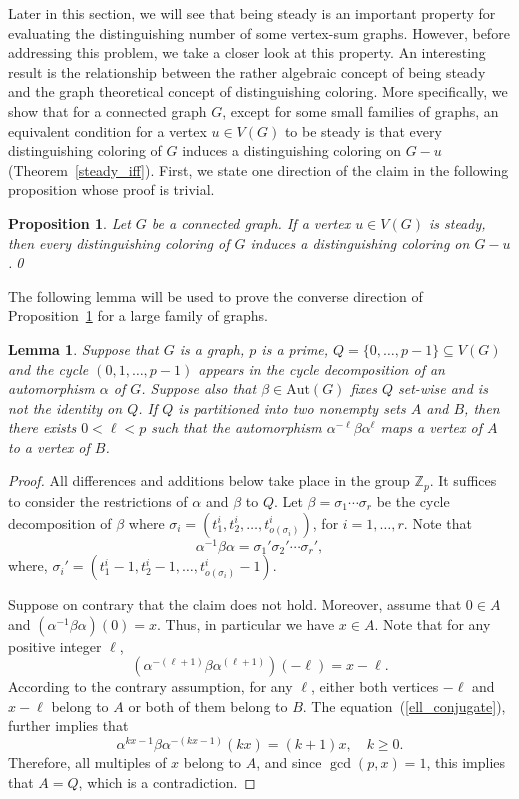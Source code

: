 \documentclass[12pt,a4paper, longbibliography]{article}
\newcommand{\aut}{\mathrm{Aut}}
\newtheorem{lemma}[theorem]{{\color{THM}Lemma}}
\newtheorem{proposition}[theorem]{{\color{THM}Proposition}}
\theoremstyle{definition}
\numberwithin{equation}{section}
\begin{document}
	Later in this section, we will see that being steady is an important property for evaluating the distinguishing number of some vertex-sum graphs. However, before addressing this problem, we   take a closer look at this property. An interesting result is the relationship between the rather algebraic concept of being steady and the graph theoretical concept of distinguishing coloring. More specifically,  we show that for a connected graph $G$, except for some small families of graphs, an equivalent condition for a vertex $u\in V(G)$ to be steady is that every distinguishing coloring of $G$ induces a distinguishing coloring on $G-u$ (Theorem~\ref{steady_iff}). First, we state one direction of the claim in the following proposition whose proof is trivial.
	
	\begin{proposition}\label{steady_then_disting}
		Let $G$ be a connected graph. If a vertex $u\in V(G)$ is steady, then every distinguishing coloring of $G$ induces a distinguishing coloring on $G-u$.\qed
	\end{proposition}

The following lemma  will be used to prove the converse  direction of Proposition~\ref{steady_then_disting} for a large family of graphs.
	
	
	\begin{lemma}\label{partition_A_B}
		Suppose that $G$ is a graph, $p$ is a prime, $Q=\{0,\ldots,p-1\}\subseteq V(G)$ and the cycle $(0,1,\ldots,p-1)$ appears in the cycle decomposition of an automorphism $\alpha$ of $G$. Suppose also that $\beta\in \aut(G)$ fixes $Q$ set-wise and is not the identity on $Q$. If $Q$ is partitioned into two nonempty sets $A$ and $B$, then there exists $0<\ell<p$ such that the automorphism $\alpha^{-\ell} \beta \alpha^{\ell}$ maps a vertex of $A$ to a vertex of $B$.
	\end{lemma}
	\begin{proof}
		All differences and additions below take place in the group $\mathbb{Z}_p$. It suffices to consider the restrictions of $\alpha$ and $\beta$ to $Q$. 
		Let $\beta=\sigma_1\cdots\sigma_r$ be the cycle decomposition of $\beta$ where $\sigma_i=(t_1^i, t_2^i,\ldots, t_{o(\sigma_i)}^i)$, for $i=1,\ldots, r$.  Note that 
		\[\alpha^{-1}\beta \alpha=\sigma_1'\sigma_2'\cdots \sigma_r',\]
		where, $\sigma_i'=(t_1^i-1, t_2^i-1, \ldots, t_{o(\sigma_i)}^i-1)$.
	
Suppose on contrary that the claim does not hold. Moreover, assume that $0\in A$ and $(\alpha^{-1} \beta \alpha)(0)=x$. Thus, in particular we have  $x\in A$.   Note that for any positive integer $\ell$,
\begin{equation}\label{ell_conjugate}
(\alpha^{-(\ell+1)} \beta  \alpha^{(\ell+1)})(-\ell)=x-\ell.
\end{equation}
According to the contrary assumption, for any $\ell$,  either both vertices $-\ell$  and $x-\ell$ belong to $A$ or both of them belong to $B$.
The equation~(\ref{ell_conjugate}), further  implies that
\[ 
\alpha^{kx-1}\beta \alpha^{-(kx-1)} (kx) = (k+1)x, \quad k\geq 0.
 \]
 Therefore, all multiples of $x$ belong to $A$, and since $\gcd(p,x)=1$, this implies that $A=Q$, which is a contradiction.
\end{proof}
	
\end{document}

